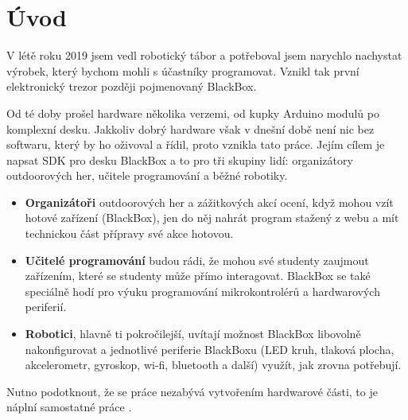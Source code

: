 \chapter{Úvod}

\enlargethispage{10mm}

V létě roku 2019 jsem vedl robotický tábor a potřeboval jsem narychlo nachystat výrobek, který bychom mohli s účastníky programovat.
Vznikl tak první elektronický trezor později pojmenovaný BlackBox.

Od té doby prošel hardware několika verzemi, od kupky Arduino modulů po komplexní desku.
Jakkoliv dobrý hardware však v dnešní době není nic bez softwaru, který by ho oživoval a řídil, proto vznikla tato práce.
Jejím cílem je napsat SDK pro desku BlackBox a to pro tři skupiny lidí: organizátory outdoorových her, učitele programování a běžné robotiky.

\begin{itemize}[noitemsep]
    \item \textbf{Organizátoři} outdoorových her a zážitkových akcí ocení, když mohou vzít hotové zařízení (BlackBox), jen do něj nahrát program stažený z webu a mít technickou část přípravy své akce hotovou.
    
    \item \textbf{Učitelé programování} budou rádi, že mohou své studenty zaujmout zařízením, které se studenty může přímo 
    interagovat. BlackBox se také speciálně hodí pro výuku programování mikrokontrolérů a hardwarových periferií. 
    
    
    \item  \textbf{Robotici}, hlavně ti pokročilejší, uvítají možnost BlackBox libovolně nakonfigurovat a jednotlivé periferie BlackBoxu (LED kruh, tlaková plocha, akcelerometr, gyroskop, wi-fi, bluetooth a další) využít, jak zrovna potřebují. 
    
\end{itemize}
Nutno podotknout, že se práce nezabývá vytvořením hardwarové části, to je náplní samostatné práce \cite{BlackBox_hardware}.


